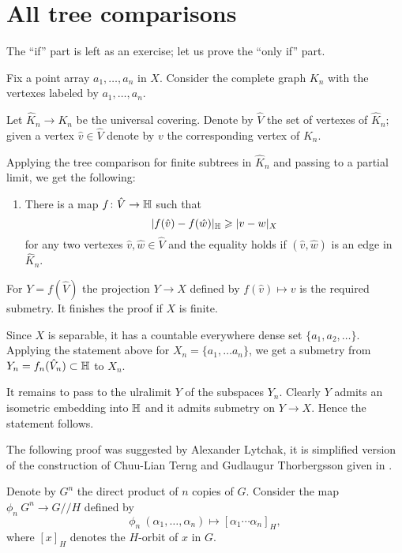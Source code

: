 \section{All tree comparisons}\label{sec:all-tree}


The ``if'' part is left as an exercise;
let us prove the ``only if'' part.

Fix a point array $a_1,\dots, a_n$ in $X$.
Consider the complete graph $K_n$ with the vertexes labeled by $a_1,\dots, a_n$.


Let $\hat K_n\to K_n$ be the universal covering.
Denote by $\hat  V$ the set of vertexes of $\hat  K_n$;
given a vertex $\hat  v\in\hat V$ denote by $v$ the corresponding vertex of $K_n$.

Applying the tree comparison for finite subtrees in $\hat  K_n$ and passing to a partial limit,  we get the following:

\begin{enumerate}[$({*})$]
\item There is a map $f\colon\hat V\to\mathbb{H}$ such that 
\[|f(\hat v)-f(\hat w)|_{\mathbb{H}}\geqslant |v-w|_X\]
for any two vertexes $\hat v,\hat w\in \hat  V$ and the equality holds if $(\hat v,\hat w)$ is an edge in $\hat  K_n$.
\end{enumerate}

For $Y=f(\hat V)$ the projection $Y\to X$ defined by $f(\hat v)\mapsto v$ is the required submetry.
It finishes the proof if $X$ is finite.

Since $X$ is separable, it has a countable everywhere dense set $\{a_1,a_2,\dots\}$. 
Applying the statement above for $X_n=\{a_1,\dots a_n\}$, we get 
a submetry from $Y_n=f_n(\hat V_n)\subset \mathbb{H}$ to $X_n$.

It remains to pass to the ulralimit $Y$ of the subspaces $Y_n$.
Clearly $Y$ admits an isometric embedding into $\mathbb{H}$ 
and it admits submetry on $Y\to X$.
Hence the statement follows.
\qeds


The following proof was suggested by Alexander Lytchak, it is simplified version of the construction of Chuu-Lian Terng and Gudlaugur Thorbergsson given in \cite[Section 4]{terng-thorbergsson}.


Denote by $G^n$ the direct product of $n$ copies of $G$.
Consider the map $\phi_n\:G^n\to G/\!\!/H$ defined by
\[\phi_n\:(\alpha_1,\dots,\alpha_n)\mapsto [\alpha_1\cdots\alpha_n]_H,\]
where $[x]_H$ denotes the $H$-orbit of $x$ in $G$.

